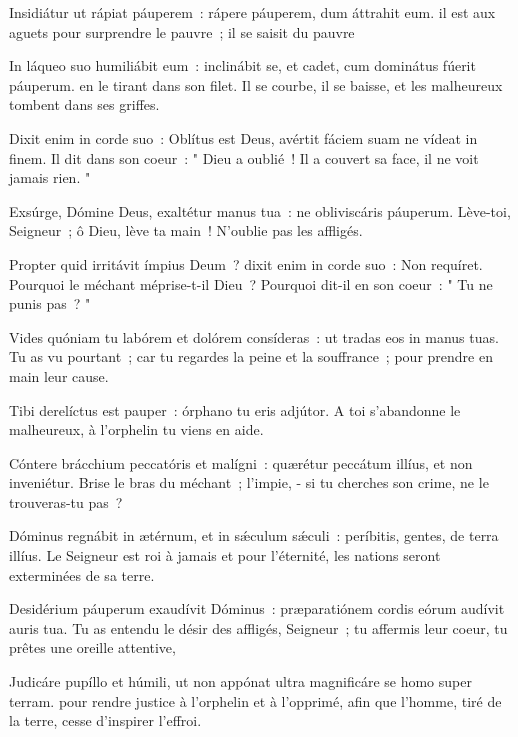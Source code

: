 \begin{paracol}{2}
    \LigneParacol{0.2cm}
    {Insidiátur ut rápiat páuperem~: \GreStar{} rápere páuperem, dum áttrahit eum.}
    {il est aux aguets pour surprendre le pauvre~; il se saisit du pauvre}

    \LigneParacol{0.2cm}
    {In láqueo suo humiliábit eum~: \GreStar{} inclinábit se, et cadet, cum dominátus fúerit páuperum.}
    {en le tirant dans son filet. Il se courbe, il se baisse, et les malheureux tombent dans ses griffes. }

    \LigneParacol{0.2cm}
    {Dixit enim in corde suo~: Oblítus est Deus, \GreStar{} avértit fáciem suam ne vídeat in finem.}
    {Il dit dans son coeur~: " Dieu a oublié~! Il a couvert sa face, il ne voit jamais rien. " }

\end{paracol}
\Gloria
\begin{paracol}{2}

    \LigneParacol{0cm}
    {Exsúrge, Dómine Deus, exaltétur manus tua~: \GreStar{} ne obliviscáris páuperum.}
    {Lève-toi, Seigneur~; ô Dieu, lève ta main~! N'oublie pas les affligés. }

    \LigneParacol{0.2cm}
    {Propter quid irritávit ímpius Deum~? \GreStar{} dixit enim in corde suo~: Non requíret.}
    {Pourquoi le méchant méprise-t-il Dieu~? Pourquoi dit-il en son coeur~: " Tu ne punis pas~? " }

    \LigneParacol{0.2cm}
    {Vides quóniam tu labórem et dolórem consíderas~: \GreStar{} ut tradas eos in manus tuas.}
    {Tu as vu pourtant~; car tu regardes la peine et la souffrance~; pour prendre en main leur cause.}

    \LigneParacol{0.2cm}
    {Tibi derelíctus est pauper~: \GreStar{} órphano tu eris adjútor.}
    {A toi s'abandonne le malheureux, à l'orphelin tu viens en aide. }

    \LigneParacol{0.2cm}
    {Cóntere brácchium peccatóris et malígni~: \GreStar{} quærétur peccátum illíus, et non inveniétur.}
    {Brise le bras du méchant~; l'impie, - si tu cherches son crime, ne le trouveras-tu pas~?}

    \LigneParacol{0.2cm}
    {Dóminus regnábit in ætérnum, et in sǽculum sǽculi~: \GreStar{} períbitis, gentes, de terra illíus.}
    {Le Seigneur est roi à jamais et pour l'éternité, les nations seront exterminées de sa terre. }

    \LigneParacol{0.2cm}
    {Desidérium páuperum exaudívit Dóminus~: \GreStar{} præparatiónem cordis eórum audívit auris tua.}
    {Tu as entendu le désir des affligés, Seigneur~; tu affermis leur coeur, tu prêtes une oreille attentive, }

    \LigneParacol{0.2cm}
    {Judicáre pupíllo et húmili, \GreStar{} ut non appónat ultra magnificáre se homo super terram.}
    {pour rendre justice à l'orphelin et à l'opprimé, afin que l'homme, tiré de la terre, cesse d'inspirer l'effroi. }

\end{paracol}
